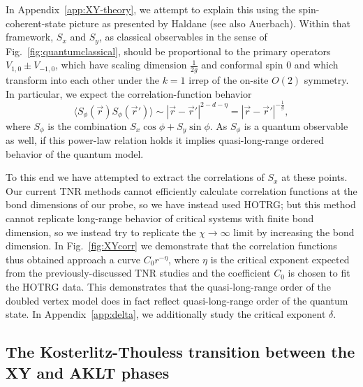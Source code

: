\documentclass[aps,prb,letterpaper,superscriptaddress,twocolumn,showpacs,floatfix,10pt]{revtex4-1}
\begin{document}
In Appendix~\ref{app:XY-theory}, we attempt
to explain this using the spin-coherent-state
picture as presented by Haldane\cite{Haldane2D} (see also
Auerbach\cite{Auerbach}). Within that framework,
$S_x$ and $S_y$, as classical observables in the sense of
Fig.~\ref{fig:quantumclassical}, should be proportional to the
primary operators
$V_{1,0}\pm V_{-1,0}$, which have scaling dimension $\frac{1}{2g}$ and conformal
spin 0 and which transform into each other under the $k=1$ irrep of the
on-site $O(2)$ symmetry. In particular, we expect the correlation-function
behavior
\begin{equation}
\langle S_\phi(\vec{r})S_\phi(\vec{r}')\rangle \sim |\vec{r}-\vec{r}'|^{2-d-\eta} = |\vec{r}-\vec{r}'|^{-\frac{1}{g}},
\end{equation}
where $S_\phi$ is the combination $S_x\cos\phi + S_y\sin\phi$. As 
$S_\phi$ is a quantum observable as well, if this power-law relation holds
it implies quasi-long-range ordered behavior of the quantum model.

To this end we have attempted to extract
the correlations of $S_x$ at these points. Our current TNR methods
cannot efficiently calculate correlation functions at the
bond dimensions of our probe, so we have instead used HOTRG; but this method
cannot replicate long-range behavior of critical systems with finite bond
dimension, so we instead try to replicate the $\chi\to\infty$ limit by
increasing the bond dimension.  In Fig.~\ref{fig:XYcorr} we demonstrate
that the correlation functions thus obtained approach 
a curve $C_0r^{-\eta}$, where $\eta$ is the critical exponent expected from the
previously-discussed TNR studies and the coefficient $C_0$ is chosen to fit
the HOTRG data. This demonstrates that the quasi-long-range
order of the doubled vertex model does in fact reflect quasi-long-range order
of the quantum state. In Appendix~\ref{app:delta}, we additionally study
the critical exponent $\delta$.


\subsection{The Kosterlitz-Thouless transition between the XY and AKLT phases}
\label{sec:KT}
\end{document}
